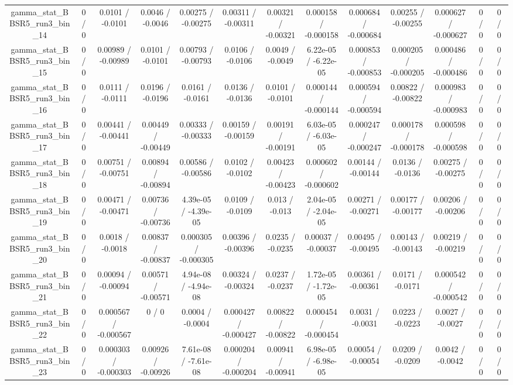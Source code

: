 \documentclass[10pt]{article}
\begin{document}
\begin{table}[htbp]
\begin{center}
\begin{tabular}{|c|c|c|c|c|c|c|c|c|c|c|c|c|}
  gamma_stat_BBSR5_run3_bin_14 & 0 / 0 & 0.0101 / -0.0101 & 0.0046 / -0.0046 & 0.00275 / -0.00275 & 0.00311 / -0.00311 & 0.00321 / -0.00321 & 0.000158 / -0.000158 & 0.000684 / -0.000684 & 0.00255 / -0.00255 & 0.000627 / -0.000627 & 0 / 0 & 0 / 0 \\ 
  gamma_stat_BBSR5_run3_bin_15 & 0 / 0 & 0.00989 / -0.00989 & 0.0101 / -0.0101 & 0.00793 / -0.00793 & 0.0106 / -0.0106 & 0.0049 / -0.0049 & 6.22e-05 / -6.22e-05 & 0.000853 / -0.000853 & 0.000205 / -0.000205 & 0.000486 / -0.000486 & 0 / 0 & 0 / 0 \\ 
  gamma_stat_BBSR5_run3_bin_16 & 0 / 0 & 0.0111 / -0.0111 & 0.0196 / -0.0196 & 0.0161 / -0.0161 & 0.0136 / -0.0136 & 0.0101 / -0.0101 & 0.000144 / -0.000144 & 0.000594 / -0.000594 & 0.00822 / -0.00822 & 0.000983 / -0.000983 & 0 / 0 & 0 / 0 \\ 
  gamma_stat_BBSR5_run3_bin_17 & 0 / 0 & 0.00441 / -0.00441 & 0.00449 / -0.00449 & 0.00333 / -0.00333 & 0.00159 / -0.00159 & 0.00191 / -0.00191 & 6.03e-05 / -6.03e-05 & 0.000247 / -0.000247 & 0.000178 / -0.000178 & 0.000598 / -0.000598 & 0 / 0 & 0 / 0 \\ 
  gamma_stat_BBSR5_run3_bin_18 & 0 / 0 & 0.00751 / -0.00751 & 0.00894 / -0.00894 & 0.00586 / -0.00586 & 0.0102 / -0.0102 & 0.00423 / -0.00423 & 0.000602 / -0.000602 & 0.00144 / -0.00144 & 0.0136 / -0.0136 & 0.00275 / -0.00275 & 0 / 0 & 0 / 0 \\ 
  gamma_stat_BBSR5_run3_bin_19 & 0 / 0 & 0.00471 / -0.00471 & 0.00736 / -0.00736 & 4.39e-05 / -4.39e-05 & 0.0109 / -0.0109 & 0.013 / -0.013 & 2.04e-05 / -2.04e-05 & 0.00271 / -0.00271 & 0.00177 / -0.00177 & 0.00206 / -0.00206 & 0 / 0 & 0 / 0 \\ 
  gamma_stat_BBSR5_run3_bin_20 & 0 / 0 & 0.0018 / -0.0018 & 0.00837 / -0.00837 & 0.000305 / -0.000305 & 0.00396 / -0.00396 & 0.0235 / -0.0235 & 0.00037 / -0.00037 & 0.00495 / -0.00495 & 0.00143 / -0.00143 & 0.00219 / -0.00219 & 0 / 0 & 0 / 0 \\ 
  gamma_stat_BBSR5_run3_bin_21 & 0 / 0 & 0.00094 / -0.00094 & 0.00571 / -0.00571 & 4.94e-08 / -4.94e-08 & 0.00324 / -0.00324 & 0.0237 / -0.0237 & 1.72e-05 / -1.72e-05 & 0.00361 / -0.00361 & 0.0171 / -0.0171 & 0.000542 / -0.000542 & 0 / 0 & 0 / 0 \\ 
  gamma_stat_BBSR5_run3_bin_22 & 0 / 0 & 0.000567 / -0.000567 & 0 / 0 & 0.0004 / -0.0004 & 0.000427 / -0.000427 & 0.00822 / -0.00822 & 0.000454 / -0.000454 & 0.0031 / -0.0031 & 0.0223 / -0.0223 & 0.0027 / -0.0027 & 0 / 0 & 0 / 0 \\ 
  gamma_stat_BBSR5_run3_bin_23 & 0 / 0 & 0.000303 / -0.000303 & 0.00926 / -0.00926 & 7.61e-08 / -7.61e-08 & 0.000204 / -0.000204 & 0.00941 / -0.00941 & 6.98e-05 / -6.98e-05 & 0.00054 / -0.00054 & 0.0209 / -0.0209 & 0.0042 / -0.0042 & 0 / 0 & 0 / 0 \\ 

\end{tabular}
\end{center}
\end{table}
\end{document}
